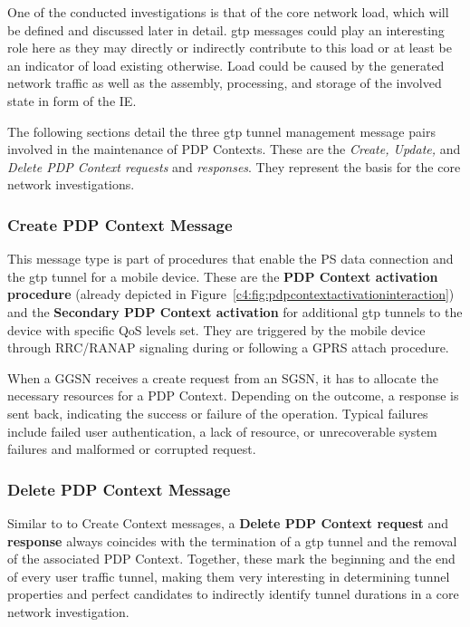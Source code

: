 One of the conducted investigations is that of the core network load, which will be defined and discussed later in detail. \gls{gtp} messages could play an interesting role here as they may directly or indirectly contribute to this load or at least be an indicator of load existing otherwise. Load could be caused by the generated network traffic as well as the assembly, processing, and storage of the involved state in form of the \gls{IE}.

The following sections detail the three \gls{gtp} tunnel management message pairs involved in the maintenance of \gls{PDP} Contexts. These are the \textit{Create, Update,} and \textit{Delete \gls{PDP} Context requests} and \textit{responses}. They represent the basis for the core network investigations.


\subsubsection{Create \gls{PDP} Context Message}

This message type is part of procedures that enable the \gls{PS} data connection and the \gls{gtp} tunnel for a mobile device. These are the \textbf{\gls{PDP} Context activation procedure} (already depicted in Figure~\ref{c4:fig:pdpcontextactivationinteraction}) and the \textbf{Secondary \gls{PDP} Context activation} for additional \gls{gtp} tunnels to the device with specific \gls{QoS} levels set. They are triggered by the mobile device through \gls{RRC}/\gls{RANAP} signaling during or following a \gls{GPRS} attach procedure.

When a \gls{GGSN} receives a create request from an \gls{SGSN}, it has to allocate the necessary resources for a \gls{PDP} Context. Depending on the outcome, a response is sent back, indicating the success or failure of the operation. Typical failures include failed user authentication, a lack of resource, or unrecoverable system failures and malformed or corrupted request.


\subsubsection{Delete \gls{PDP} Context Message}

Similar to to Create Context messages, a \textbf{Delete \gls{PDP} Context request} and \textbf{response} always coincides with the termination of a \gls{gtp} tunnel and the removal of the associated \gls{PDP} Context. Together, these mark the beginning and the end of every user traffic tunnel, making them very interesting in determining tunnel properties and perfect candidates to indirectly identify tunnel durations in a core network investigation.

